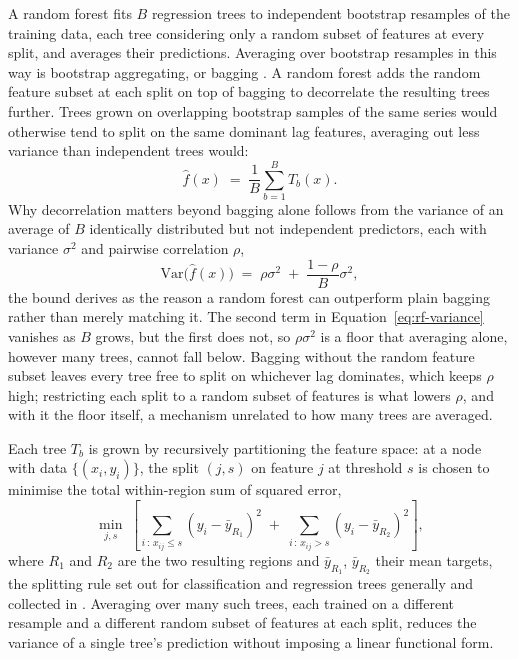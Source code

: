 \documentclass[12pt,a4paper]{report}
\begin{document}
A random forest \citep{breiman2001random} fits $B$ regression trees to
independent bootstrap resamples of the training data, each tree considering
only a random subset of features at every split, and averages their
predictions. Averaging over bootstrap resamples in this way is bootstrap
aggregating, or bagging \citep{breiman1996bagging}. A random forest adds the
random feature subset at each split on top of bagging to decorrelate the
resulting trees further. Trees grown on overlapping bootstrap samples of the
same series would otherwise tend to split on the same dominant lag features,
averaging out less variance than independent trees would:
\begin{equation}
\hat f(x) \;=\; \frac{1}{B}\sum_{b=1}^{B} T_b(x).
\label{eq:rf}
\end{equation}
Why decorrelation matters beyond bagging alone follows from the variance of
an average of $B$ identically distributed but not independent predictors,
each with variance $\sigma^2$ and pairwise correlation $\rho$,
\begin{equation}
\mathrm{Var}\big(\hat f(x)\big) \;=\; \rho\sigma^2 \;+\; \frac{1-\rho}{B}\sigma^2,
\label{eq:rf-variance}
\end{equation}
the bound \citet{breiman2001random} derives as the reason a random forest
can outperform plain bagging rather than merely matching it. The second
term in Equation~\ref{eq:rf-variance} vanishes as $B$ grows, but the first
does not, so $\rho\sigma^2$ is a floor that averaging alone, however many
trees, cannot fall below. Bagging without the random feature subset leaves
every tree free to split on whichever lag dominates, which keeps $\rho$
high; restricting each split to a random subset of features is what lowers
$\rho$, and with it the floor itself, a mechanism unrelated to
how many trees are averaged.

Each tree $T_b$ is grown by recursively partitioning the feature space: at a
node with data $\{(x_i,y_i)\}$, the split $(j,s)$ on feature $j$ at threshold
$s$ is chosen to minimise the total within-region sum of squared error,
\begin{equation}
\min_{j,s} \; \left[ \sum_{i\,:\,x_{ij} \le s} (y_i - \bar y_{R_1})^2 \;+\;
\sum_{i\,:\,x_{ij} > s} (y_i - \bar y_{R_2})^2 \right],
\label{eq:rf-split}
\end{equation}
where $R_1$ and $R_2$ are the two resulting regions and $\bar y_{R_1}$,
$\bar y_{R_2}$ their mean targets, the splitting rule set out for
classification and regression trees generally and collected in
\citet{breiman1984cart}.
Averaging over many such trees, each trained on a different resample and a
different random subset of features at each split, reduces the variance of a
single tree's prediction without imposing a linear functional form.
\end{document}
